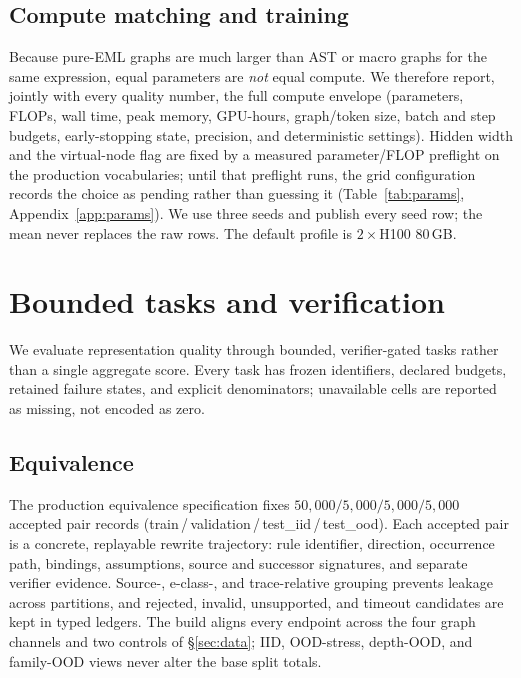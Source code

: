 \documentclass[11pt]{article}
\begin{document}
\subsection{Compute matching and training}
\label{sec:compute}
Because pure-EML graphs are much larger than AST or macro graphs for the same
expression, equal parameters are \emph{not} equal compute. We therefore report,
jointly with every quality number, the full compute envelope (parameters, FLOPs,
wall time, peak memory, GPU-hours, graph/token size, batch and step budgets,
early-stopping state, precision, and deterministic
settings). Hidden width and the virtual-node flag are fixed by a measured
parameter/FLOP preflight on the production vocabularies; until that preflight
runs, the grid configuration records the choice as pending rather than
guessing it (Table~\ref{tab:params}, Appendix~\ref{app:params}). We use three seeds and
publish every seed row; the mean never replaces the raw rows. The default profile
is $2\times$H100 $80$\,GB.

\section{Bounded tasks and verification}
\label{sec:tasks}

We evaluate representation quality through bounded, verifier-gated tasks rather
than a single aggregate score. Every task has frozen identifiers, declared
budgets, retained failure states, and explicit denominators; unavailable cells are
reported as missing, not encoded as zero.

\subsection{Equivalence}

The production equivalence specification fixes
$50{,}000/5{,}000/5{,}000/5{,}000$ accepted pair records
(train\,/\,validation\,/\,test\_iid\,/\,test\_ood). Each accepted pair is a
concrete, replayable rewrite trajectory: rule identifier, direction, occurrence
path, bindings, assumptions, source and successor signatures, and separate
verifier evidence. Source-, e-class-, and trace-relative grouping prevents
leakage across partitions, and rejected, invalid, unsupported, and timeout
candidates are kept in typed ledgers. The build
aligns every endpoint across the four graph channels and two controls of
\S\ref{sec:data}; IID, OOD-stress, depth-OOD, and family-OOD views never alter
the base split totals.
\end{document}
